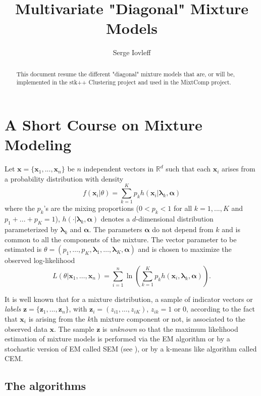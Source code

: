 \documentclass[a4paper,10pt]{article}
\title{Multivariate "Diagonal" Mixture Models}
\author{Serge Iovleff}
\newcommand{\Rd}{{\mathbb{R}^d}}
\newcommand{\bx}{\mathbf{x}}
\newcommand{\bz}{\mathbf{z}}
\newcommand{\balpha}{\boldsymbol{\alpha}}
\newcommand{\blambda}{\boldsymbol{\lambda}}
\begin{document}
\maketitle

\begin{abstract}
This document resume the different "diagonal" mixture models that are, or will be, implemented
in the stk++ Clustering project and used in the MixtComp project.
\end{abstract}


\section{A Short Course on Mixture Modeling}
Let ${\bx}=\{ {\bx}_1,...,{\bx}_n\}$ be $n$ independent vectors in $\Rd$ such that each
${\bx}_i$ arises from a probability distribution with density
\begin{equation}
  f({\bx}_i|\theta) = \sum_{k=1}^K p_k h({\bx}_{i}| \blambda_{k},\balpha)
\end{equation}
where the $p_k$'s are the mixing proportions ($0<p_k<1$ for all $k=1,...,K$ and
$p_1+...+p_K=1$), $h(\cdot| \blambda_{k},\balpha)$ denotes a $d$-dimensional distribution parameterized
by $\blambda_k$ and $\balpha$. The parameters $\balpha$ do not depend from $k$ and is common
to all the components of the mixture.
The vector parameter to be estimated is $\theta=(p_1,\ldots,p_K,\blambda_1,\ldots,\blambda_K, \balpha)$
and is chosen to maximize the observed log-likelihood
\begin{equation}
  \label{eq:vraisemblance}
  L(\theta|\bx_1,\ldots,\bx_n)=\sum_{i=1}^n \ln \left(\sum_{k=1}^K p_k h(\bx_i,\blambda_k, \balpha)\right).
\end{equation}

It is well known that for a mixture distribution, a sample of indicator vectors or {\em labels}
${\bz}=\{ {\bz}_1,...,{\bz}_n\}$, with ${\bz}_i=(z_{i1},\ldots,z_{iK})$,
$z_{ik}=1$ or 0, according to the fact that ${\bx}_i$ is arising from the $k$th mixture
component or not, is associated to the observed data ${\bx}$. The sample ${\bz}$ is {\em unknown}
so that the maximum likelihood estimation of mixture models is performed via the EM algorithm
\cite{Dempster97} or by a stochastic version of EM called SEM (see \cite{McLachlanPeel00}), or by
a k-means like algorithm called CEM.

\subsection{The algorithms}
\end{document}
